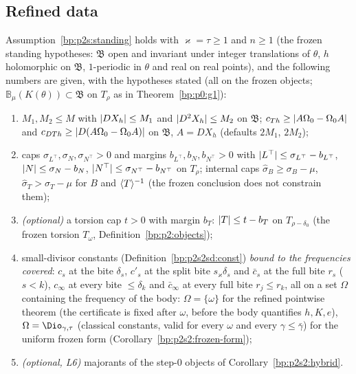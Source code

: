 \subsection{Refined data}\label{bp:p2s2:sec-data}

\begin{assumption}\label{bp:p2s2:standing}
Assumption~\ref{bp:p2s:standing} holds with $\varkappa=\tau\ge1$ and $n\ge1$ (the frozen standing hypotheses: $\mathfrak B$ open and
invariant under integer translations of $\theta$, $h$ holomorphic on $\mathfrak B$, $1$-periodic in $\theta$ and real on real points), and the
following numbers are given, with the hypotheses stated (all on the frozen objects; $\mathbb B_\mu(K(\theta))\subset\mathfrak B$ on $T_\rho$ as in
Theorem~\ref{bp:p0:g1}):
\begin{enumerate}[label=(R\arabic*)]
\item\label{bp:p2s2:R1} $M_1,M_2\le M$ with $\lvert DX_h\rvert\le M_1$ and $\lvert D^2X_h\rvert\le M_2$ on $\mathfrak B$; $c_{Th}\ge\lvert A\Omega_0-\Omega_0A\rvert$ and
  $c_{DTh}\ge\lvert D(A\Omega_0-\Omega_0A)\rvert$ on $\mathfrak B$, $A=DX_h$ (defaults $2M_1$, $2M_2$);
\item\label{bp:p2s2:R2} caps $\sigma_{L^\top},\sigma_N,\sigma_{N^\top}>0$ and margins $b_{L^\top},b_N,b_{N^\top}>0$ with $\lvert L^\top\rvert\le\sigma_{L^\top}-b_{L^\top}$,
  $\lvert N\rvert\le\sigma_N-b_N$, $\lvert N^\top\rvert\le\sigma_{N^\top}-b_{N^\top}$ on $T_\rho$; internal caps $\hat\sigma_B\ge\sigma_B-\mu$, $\hat\sigma_T>\sigma_T-\mu$ for $B$
  and $\langle T\rangle^{-1}$ (the frozen conclusion does not constrain them);
\item\label{bp:p2s2:R3} \emph{(optional)} a torsion cap $t>0$ with margin $b_T$: $\lvert T\rvert\le t-b_T$ on $T_{\rho-\delta_0}$ (the frozen torsion
  $T_\omega$, Definition~\ref{bp:p2:objects});
\item\label{bp:p2s2:R4} small-divisor constants (Definition~\ref{bp:p2s2sd:const}) \emph{bound to the frequencies covered}: $c_s$ at the bite
  $\delta_s$, $c'_s$ at the split bite $s_\varkappa\delta_s$ and $\bar c_s$ at the full bite $r_s$ ($s<k$), $c_\infty$ at every bite $\le\delta_k$ and
  $\bar c_\infty$ at every full bite $r_j\le r_k$, all on a set $\Omega$ containing the frequency of the body: $\Omega=\{\omega\}$ for the refined
  pointwise theorem (the certificate is fixed after $\omega$, before the body quantifies $h,K,e$), $\Omega=\Dio_{\gamma,\tau}$ (classical
  constants, valid for every $\omega$ and every $\gamma\le\bar\gamma$) for the uniform frozen form (Corollary~\ref{bp:p2s2:frozen-form});
\item\label{bp:p2s2:R5} \emph{(optional, L6)} majorants of the step-0 objects of Corollary~\ref{bp:p2s2:hybrid}.
\end{enumerate}
\end{assumption}

